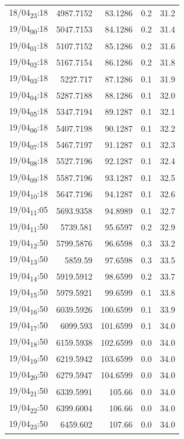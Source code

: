 \documentclass[11pt]{article}
\begin{document}
\begin{center}
\begin{tabular}{lrrrr}
18/04\textsubscript{23}:18 & 4987.7152 & 83.1286 & 0.2 & 31.2\\[0pt]
19/04\textsubscript{00}:18 & 5047.7153 & 84.1286 & 0.2 & 31.4\\[0pt]
19/04\textsubscript{01}:18 & 5107.7152 & 85.1286 & 0.2 & 31.6\\[0pt]
19/04\textsubscript{02}:18 & 5167.7154 & 86.1286 & 0.2 & 31.8\\[0pt]
19/04\textsubscript{03}:18 & 5227.717 & 87.1286 & 0.1 & 31.9\\[0pt]
19/04\textsubscript{04}:18 & 5287.7188 & 88.1286 & 0.1 & 32.0\\[0pt]
19/04\textsubscript{05}:18 & 5347.7194 & 89.1287 & 0.1 & 32.1\\[0pt]
19/04\textsubscript{06}:18 & 5407.7198 & 90.1287 & 0.1 & 32.2\\[0pt]
19/04\textsubscript{07}:18 & 5467.7197 & 91.1287 & 0.1 & 32.3\\[0pt]
19/04\textsubscript{08}:18 & 5527.7196 & 92.1287 & 0.1 & 32.4\\[0pt]
19/04\textsubscript{09}:18 & 5587.7196 & 93.1287 & 0.1 & 32.5\\[0pt]
19/04\textsubscript{10}:18 & 5647.7196 & 94.1287 & 0.1 & 32.6\\[0pt]
19/04\textsubscript{11}:05 & 5693.9358 & 94.8989 & 0.1 & 32.7\\[0pt]
19/04\textsubscript{11}:50 & 5739.581 & 95.6597 & 0.2 & 32.9\\[0pt]
19/04\textsubscript{12}:50 & 5799.5876 & 96.6598 & 0.3 & 33.2\\[0pt]
19/04\textsubscript{13}:50 & 5859.59 & 97.6598 & 0.3 & 33.5\\[0pt]
19/04\textsubscript{14}:50 & 5919.5912 & 98.6599 & 0.2 & 33.7\\[0pt]
19/04\textsubscript{15}:50 & 5979.5921 & 99.6599 & 0.1 & 33.8\\[0pt]
19/04\textsubscript{16}:50 & 6039.5926 & 100.6599 & 0.1 & 33.9\\[0pt]
19/04\textsubscript{17}:50 & 6099.593 & 101.6599 & 0.1 & 34.0\\[0pt]
19/04\textsubscript{18}:50 & 6159.5938 & 102.6599 & 0.0 & 34.0\\[0pt]
19/04\textsubscript{19}:50 & 6219.5942 & 103.6599 & 0.0 & 34.0\\[0pt]
19/04\textsubscript{20}:50 & 6279.5947 & 104.6599 & 0.0 & 34.0\\[0pt]
19/04\textsubscript{21}:50 & 6339.5991 & 105.66 & 0.0 & 34.0\\[0pt]
19/04\textsubscript{22}:50 & 6399.6004 & 106.66 & 0.0 & 34.0\\[0pt]
19/04\textsubscript{23}:50 & 6459.602 & 107.66 & 0.0 & 34.0\\[0pt]
\end{tabular}
\end{center}
\end{document}
